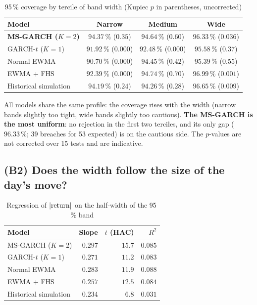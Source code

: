 \documentclass[12pt,a4paper]{article}
\begin{document}
\begin{table}[H]
	\centering
	\small
	\caption{95\,\% coverage by tercile of band width (Kupiec $p$ in parentheses, uncorrected)}
	\label{tab:bm-terciles}
	\begin{tabular}{lccc}
		\toprule
		Model & Narrow & Medium & Wide \\
		\midrule
		\textbf{MS-GARCH ($K=2$)} & $94.37\,\%$ ($0.35$) & $94.64\,\%$ ($0.60$) & $96.33\,\%$ ($0.036$) \\
		GARCH-$t$ ($K=1$) & $91.92\,\%$ ($0.000$) & $92.48\,\%$ ($0.000$) & $95.58\,\%$ ($0.37$) \\
		Normal EWMA & $90.70\,\%$ ($0.000$) & $94.45\,\%$ ($0.42$) & $95.39\,\%$ ($0.55$) \\
		EWMA + FHS & $92.39\,\%$ ($0.000$) & $94.74\,\%$ ($0.70$) & $96.99\,\%$ ($0.001$) \\
		Historical simulation & $94.19\,\%$ ($0.24$) & $94.26\,\%$ ($0.28$) & $96.65\,\%$ ($0.009$) \\
		\bottomrule
	\end{tabular}
\end{table}

All models share the same profile: the coverage rises with the width (narrow bands slightly too tight, wide bands slightly too cautious). \textbf{The MS-GARCH is the most uniform}: no rejection in the first two terciles, and its only gap ($96.33\,\%$; 39 breaches for 53 expected) is on the cautious side. The $p$-values are not corrected over 15 tests and are indicative.

\subsection{(B2) Does the width follow the size of the day's move?}

\begin{table}[H]
	\centering
	\caption{Regression of $|{\rm return}|$ on the half-width of the 95\,\% band}
	\label{tab:bm-mz}
	\begin{tabular}{lrrr}
		\toprule
		Model & Slope & $t$ (HAC) & $R^2$ \\
		\midrule
		MS-GARCH ($K=2$) & $0.297$ & $15.7$ & $0.085$ \\
		GARCH-$t$ ($K=1$) & $0.271$ & $11.2$ & $0.083$ \\
		Normal EWMA & $0.283$ & $11.9$ & $0.088$ \\
		EWMA + FHS & $0.257$ & $12.5$ & $0.084$ \\
		Historical simulation & $0.234$ & $6.8$ & $0.031$ \\
		\bottomrule
	\end{tabular}
\end{table}
\end{document}
